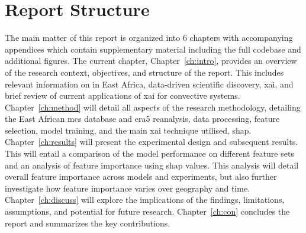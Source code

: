 \section{Report Structure}

The main matter of this report is organized into 6 chapters with accompanying appendices which contain supplementary material including the full codebase and additional figures. The current chapter, Chapter~\ref{ch:intro}, provides an overview of the research context, objectives, and structure of the report. This includes relevant information on  in East Africa, data-driven scientific discovery, \acrfull{xai}, and brief review of current applications of \acrshort{xai} for convective systems. Chapter~\ref{ch:method} will detail all aspects of the research methodology, detailing the East African \acrshort{mcs} database and \acrshort{era5} reanalysis, data processing, feature selection, model training, and the main \acrshort{xai} technique utilised, \acrshort{shap}. Chapter~\ref{ch:results} will present the experimental design and subsequent results. This will entail a comparison of the model performance on different feature sets and an analysis of feature importance using \acrshort{shap} values. This analysis will detail overall feature importance across models and experiments, but also further investigate how feature importance varies over geography and time. Chapter~\ref{ch:discuss} will explore the implications of the findings, limitations, assumptions, and potential for future research. Chapter~\ref{ch:con} concludes the report and summarizes the key contributions.